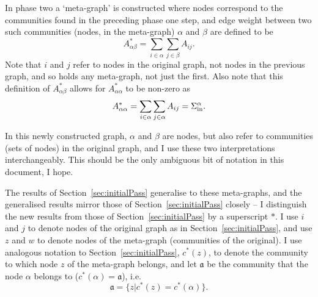 \documentclass{article}
\begin{document}
In phase two a `meta-graph' is constructed where nodes correspond to 
the communities found in the preceding phase one step, and edge weight
between two such communities (nodes, in the meta-graph)
$\alpha$ and $\beta$ are defined to be
\begin{equation}
	A_{\alpha \beta}^* = \sum_{i \in \alpha}\sum_{j \in \beta}A_{ij}.
	\label{eqn:Aij*}
\end{equation} 
Note that $i$ and $j$ refer to nodes in the original graph, not nodes 
in the previous graph, and so holds any meta-graph, not just the first.
Also note that this definition of $A^*_{\alpha \beta}$ allows for 
$A^*_{\alpha \alpha}$ to be non-zero as
\begin{equation}
A_{\alpha \alpha}^* = \sum_{i \in \alpha}\sum_{j \in \alpha}A_{ij} = \Sigma_{\text{in}}^{\alpha}.
\end{equation} 

In this newly constructed graph, $\alpha$ and $\beta$ are nodes, but 
also refer to communities (sets of nodes) in the original graph, and I 
use these two interpretations interchangeably.
This should be the only ambiguous bit of notation in this document, I hope.

The results of Section~\ref{sec:initialPass} generalise to these meta-graphs,
and the generalised results mirror those of Section~\ref{sec:initialPass} closely
-- I distinguish the new results from those of Section~\ref{sec:initialPass} by a 
superscript $*$.
I use $i$ and $j$ to denote nodes of the original graph as in Section~\ref{sec:initialPass}, 
and use $z$ and $w$ to denote nodes of the meta-graph (communities of the original).
I use analogous notation to Section~\ref{sec:initialPass}, $c^*(z)$, to 
denote the community to which node $z$ of the meta-graph belongs, 
and let $\mathfrak{a}$ be the community that the node $\alpha$ belongs to 
($c^*(\alpha) = \mathfrak{a}$), i.e.
\begin{equation}
	\mathfrak{a} = \{z | c^*(z) = c^*(\alpha) \}.
\end{equation}
\end{document}
